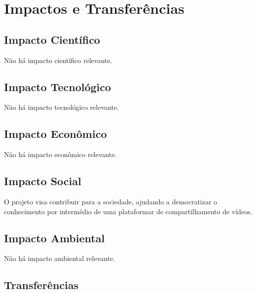 \documentclass[a4paper,10pt]{article} %
\begin{document}
\section{Impactos e Transferências}

\subsection{Impacto Científico}

Não há impacto científico relevante.

\subsection{Impacto Tecnológico}

Não há impacto tecnológico relevante.

\subsection{Impacto Econômico}

Não há impacto econômico relevante.

\subsection{Impacto Social}

O projeto visa contribuir para a sociedade, ajudando a democratizar o conhecimento por intermédio de uma plataformar de compartilhamento de vídeos.

\subsection{Impacto Ambiental}

Não há impacto ambiental relevante.

\subsection{Transferências}
\end{document}
